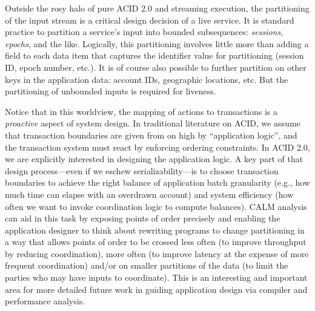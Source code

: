 \documentclass{sig-alternate}
\newcommand{\nrc}[1]{{\textcolor{green}{[[#1 -- nrc]]}}}
\begin{document}
Outside the rosy halo of pure ACID 2.0 and streaming execution, the partitioning
of the input stream is a critical design decision of a live service.  It is
standard practice to partition a service's input into bounded subsequences:
\emph{sessions}, \emph{epochs}, and the like. Logically, this partitioning
involves little more than adding a field to each data item that captures the
identifier value for partitioning (session ID, epoch number, etc.).  It is of
course also possible to further partition on other keys in the application data:
account IDs, geographic locations, etc.  But the partitioning of unbounded
inputs is required for liveness.

Notice that in this worldview, the mapping of actions to transactions is a \emph{proactive} aspect of system design.  In traditional literature on ACID, we assume that transaction boundaries are given from on high by ``application logic'', and the transaction system must react by enforcing ordering constraints.  In ACID 2.0, we are explicitly interested in designing the application logic.  A key part of that design process---even if we eschew serializability---is to choose transaction boundaries to achieve the right balance of application batch granularity (e.g., how much time can elapse with an overdrawn account) and system efficiency (how often we want to invoke coordination logic to compute balances).  CALM analysis can aid in this task by exposing points of order precisely and enabling the application designer to think about rewriting programs to change partitioning in a way that allows points of order to be crossed less often (to improve throughput by reducing coordination), more often (to improve latency at the expense of more frequent coordination) and/or on smaller partitions of the data (to limit the parties who may have inputs to coordinate).  This is an interesting and important area for more detailed future work in guiding application design via compiler and performance analysis.

\begin{comment}
\nrc{Killed for submission copy because it seems unnecessarily provocative and
  not central to the paper.}
  The ``C'' in ACID is a common source of confusion and tedious re-definition in
  discussions of transactions and distributed systems, and we will ignore it
  here.\footnote{Consistency was apparently added to ACID simply to make it a
    more entertaining acronym.  It is often defined quite loosely in the
    transactions literature, but one concrete definition is ``enforcement of
    database integrity constraints''.  This has some bearing on our discussion
    here of partitioning keys but will have to wait for a longer paper.  The
    distributed systems community tends to use the term Consistency differently,
    with an equally frequent disregard for formalism, but without even the
    justification of forming an entertaining acronym.}
\end{comment}
\end{document}
